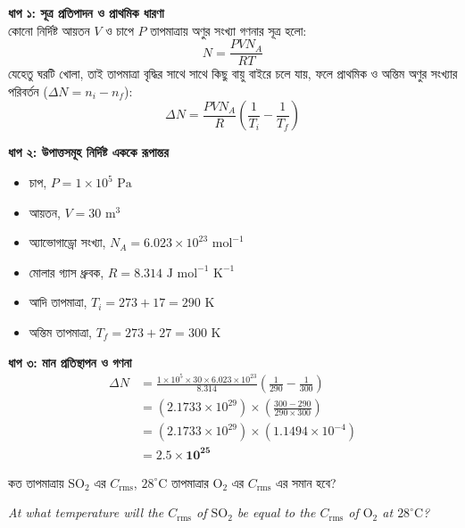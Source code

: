 \documentclass[12pt, a4paper]{article}
\begin{document}
\begin{tcolorbox}[solutionbox={সমাধান (Solution)}]
    \noindent
    \textbf{ধাপ ১: সূত্র প্রতিপাদন ও প্রাথমিক ধারণা} \\
    কোনো নির্দিষ্ট আয়তন $V$ ও চাপে $P$ তাপমাত্রায় অণুর সংখ্যা গণনার সূত্র হলো:
    \[ N = \frac{P V N_A}{R T} \]
    যেহেতু ঘরটি খোলা, তাই তাপমাত্রা বৃদ্ধির সাথে সাথে কিছু বায়ু বাইরে চলে যায়, ফলে প্রাথমিক ও অন্তিম অণুর সংখ্যার পরিবর্তন ($\Delta N = n_i - n_f$):
    \[ \Delta N = \frac{P V N_A}{R} \left(\frac{1}{T_i} - \frac{1}{T_f}\right) \]
    
    \vspace{0.4em}
    \noindent\textbf{ধাপ ২: উপাত্তসমূহ নির্দিষ্ট এককে রূপান্তর}
    \begin{itemize}[leftmargin=1.5em, itemsep=0.2em]
        \item চাপ, $P = 1 \times 10^5\text{ Pa}$
        \item আয়তন, $V = 30\text{ m}^3$
        \item অ্যাভোগাড্রো সংখ্যা, $N_A = 6.023 \times 10^{23}\text{ mol}^{-1}$
        \item মোলার গ্যাস ধ্রুবক, $R = 8.314\text{ J mol}^{-1}\text{ K}^{-1}$
        \item আদি তাপমাত্রা, $T_i = 273 + 17 = 290\text{ K}$
        \item অন্তিম তাপমাত্রা, $T_f = 273 + 27 = 300\text{ K}$
    \end{itemize}
    
    \vspace{0.4em}
    \noindent\textbf{ধাপ ৩: মান প্রতিস্থাপন ও গণনা}
    \begin{align*}
        \Delta N &= \frac{1 \times 10^5 \times 30 \times 6.023 \times 10^{23}}{8.314} \left(\frac{1}{290} - \frac{1}{300}\right) \\
        &= (2.1733 \times 10^{29}) \times \left(\frac{300 - 290}{290 \times 300}\right) \\
        &= (2.1733 \times 10^{29}) \times (1.1494 \times 10^{-4}) \\
        &= \mathbf{2.5 \times 10^{25}}
    \end{align*}
\end{tcolorbox}

\vspace{2em}

\begin{tcolorbox}[questionbox={প্রশ্ন (Question) 5}]
    \noindent
    কত তাপমাত্রায় $\text{SO}_2$ এর $C_{\text{rms}}$, $28^\circ\text{C}$ তাপমাত্রার $\text{O}_2$ এর $C_{\text{rms}}$ এর সমান হবে?
    
    \vspace{0.8em}
    \begin{english}
    \noindent\textit{\color{darkgray}
    At what temperature will the $C_{\text{rms}}$ of $\text{SO}_2$ be equal to the $C_{\text{rms}}$ of $\text{O}_2$ at $28^\circ\text{C}$?
    }
    \end{english}
\end{tcolorbox}
\end{document}
